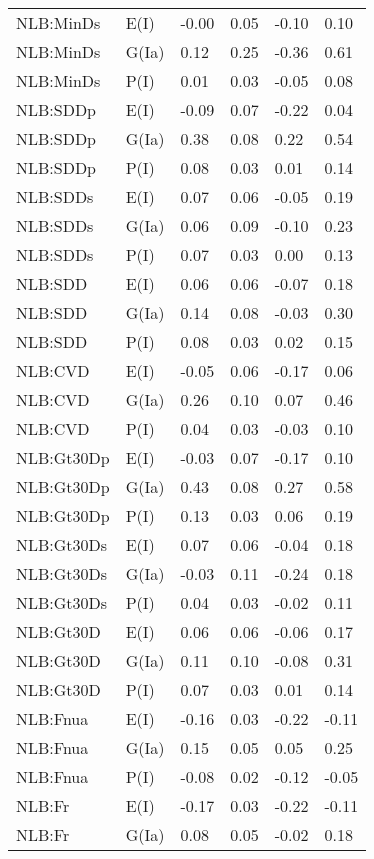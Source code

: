 \begin{center}
\begin{longtable}{|p{1.1in}|p{0.7in}|p{0.7in}|p{0.6in}|p{0.6in}|p{0.6in}|}
  NLB:MinDs & E(I) & -0.00 & 0.05 & -0.10 & 0.10 \\ 
  NLB:MinDs & G(Ia) & 0.12 & 0.25 & -0.36 & 0.61 \\ 
  NLB:MinDs & P(I) & 0.01 & 0.03 & -0.05 & 0.08 \\ 
  NLB:SDDp & E(I) & -0.09 & 0.07 & -0.22 & 0.04 \\ 
  NLB:SDDp & G(Ia) & 0.38 & 0.08 & 0.22 & 0.54 \\ 
  NLB:SDDp & P(I) & 0.08 & 0.03 & 0.01 & 0.14 \\ 
  NLB:SDDs & E(I) & 0.07 & 0.06 & -0.05 & 0.19 \\ 
  NLB:SDDs & G(Ia) & 0.06 & 0.09 & -0.10 & 0.23 \\ 
  NLB:SDDs & P(I) & 0.07 & 0.03 & 0.00 & 0.13 \\ 
  NLB:SDD & E(I) & 0.06 & 0.06 & -0.07 & 0.18 \\ 
  NLB:SDD & G(Ia) & 0.14 & 0.08 & -0.03 & 0.30 \\ 
  NLB:SDD & P(I) & 0.08 & 0.03 & 0.02 & 0.15 \\ 
  NLB:CVD & E(I) & -0.05 & 0.06 & -0.17 & 0.06 \\ 
  NLB:CVD & G(Ia) & 0.26 & 0.10 & 0.07 & 0.46 \\ 
  NLB:CVD & P(I) & 0.04 & 0.03 & -0.03 & 0.10 \\ 
  NLB:Gt30Dp & E(I) & -0.03 & 0.07 & -0.17 & 0.10 \\ 
  NLB:Gt30Dp & G(Ia) & 0.43 & 0.08 & 0.27 & 0.58 \\ 
  NLB:Gt30Dp & P(I) & 0.13 & 0.03 & 0.06 & 0.19 \\ 
  NLB:Gt30Ds & E(I) & 0.07 & 0.06 & -0.04 & 0.18 \\ 
  NLB:Gt30Ds & G(Ia) & -0.03 & 0.11 & -0.24 & 0.18 \\ 
  NLB:Gt30Ds & P(I) & 0.04 & 0.03 & -0.02 & 0.11 \\ 
  NLB:Gt30D & E(I) & 0.06 & 0.06 & -0.06 & 0.17 \\ 
  NLB:Gt30D & G(Ia) & 0.11 & 0.10 & -0.08 & 0.31 \\ 
  NLB:Gt30D & P(I) & 0.07 & 0.03 & 0.01 & 0.14 \\ 
  NLB:Fnua & E(I) & -0.16 & 0.03 & -0.22 & -0.11 \\ 
  NLB:Fnua & G(Ia) & 0.15 & 0.05 & 0.05 & 0.25 \\ 
  NLB:Fnua & P(I) & -0.08 & 0.02 & -0.12 & -0.05 \\ 
  NLB:Fr & E(I) & -0.17 & 0.03 & -0.22 & -0.11 \\ 
  NLB:Fr & G(Ia) & 0.08 & 0.05 & -0.02 & 0.18 \\ 

\end{longtable}
\end{center}
